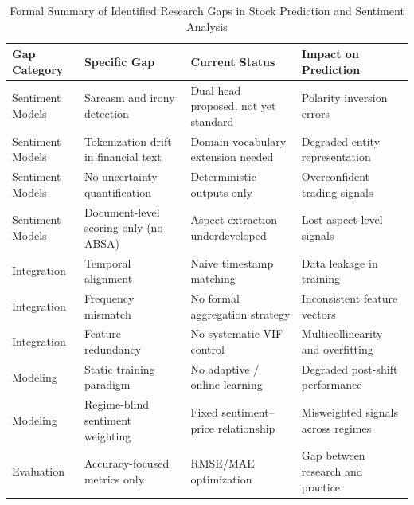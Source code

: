 \begin{table}[htbp]
\centering
\caption{Formal Summary of Identified Research Gaps in Stock Prediction and Sentiment Analysis}
\label{tab:gap_summary}
\small
\begin{tabular}{@{}p{2.8cm}p{3.8cm}p{3.2cm}p{3.5cm}@{}}
\toprule
\textbf{Gap Category} & \textbf{Specific Gap} & \textbf{Current Status} & \textbf{Impact on Prediction} \\ \midrule

Sentiment Models & Sarcasm and irony detection & Dual-head proposed, not yet standard & Polarity inversion errors \\
\addlinespace
Sentiment Models & Tokenization drift in financial text & Domain vocabulary extension needed & Degraded entity representation \\
\addlinespace
Sentiment Models & No uncertainty quantification & Deterministic outputs only & Overconfident trading signals \\
\addlinespace
Sentiment Models & Document-level scoring only (no ABSA) & Aspect extraction underdeveloped & Lost aspect-level signals \\
\addlinespace
Integration & Temporal alignment & Naive timestamp matching & Data leakage in training \\
\addlinespace
Integration & Frequency mismatch & No formal aggregation strategy & Inconsistent feature vectors \\
\addlinespace
Integration & Feature redundancy & No systematic VIF control & Multicollinearity and overfitting \\
\addlinespace
Modeling & Static training paradigm & No adaptive / online learning & Degraded post-shift performance \\
\addlinespace
Modeling & Regime-blind sentiment weighting & Fixed sentiment--price relationship & Misweighted signals across regimes \\
\addlinespace
Evaluation & Accuracy-focused metrics only & RMSE/MAE optimization & Gap between research and practice \\

\bottomrule
\end{tabular}
\end{table}

